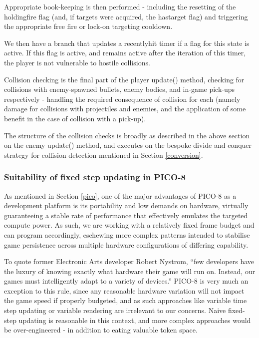 \documentclass[11pt]{article}
\begin{document}
Appropriate book-keeping is then performed - including the resetting of the holding\textunderscore fire
flag (and, if targets were acquired, the has\textunderscore target flag) and triggering the appropriate
free fire or lock-on targeting cooldown.

We then have a branch that updates a recently\textunderscore hit timer if a flag for this state
is active. If this flag is active, and remains active after the iteration of this timer, the player is
not vulnerable to hostile collisions.

Collision checking is the final part of the player update() method, checking for collisions with
enemy-spawned bullets, enemy bodies, and in-game pick-ups respectively - handling the required
consequence of collision for each (namely damage for collisions with projectiles and enemies, and
the application of some benefit in the case of collision with a pick-up).

The structure of the collision
checks is broadly as described in the above section on the enemy update() method, and executes on 
the bespoke divide and conquer strategy for collision detection mentioned in Section \ref{conversion}.

\subsubsection*{Suitability of fixed step updating in PICO-8}

As mentioned in Section \ref{pico}, one of the major advantages of PICO-8 as a development platform
is its portability and low demands on hardware, virtually guaranteeing a stable rate of performance
that effectively emulates the targeted compute power. As such, we are working with a relatively fixed
frame budget and can program accordingly, eschewing more complex patterns intended to stabilise
game persistence across multiple hardware configurations of differing capability.

To quote former Electronic Arts developer Robert Nystrom\cite[p. 126]{nystrom}, ``few developers have
the luxury of knowing exactly what hardware their game will run on. Instead, our games must intelligently
adapt to a variety of devices.'' PICO-8 is very much an exception to this rule, since any reasonable
hardware variation will not impact the game speed if properly budgeted, and as such approaches like
variable time step updating or variable rendering are irrelevant to our concerns. Naive fixed-step updating
is reasonable in this context, and more complex approaches would be over-engineered - in addition to eating
valuable token space.
\end{document}
